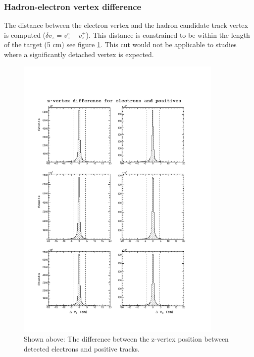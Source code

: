 \subsubsection*{Hadron-electron vertex difference}
The distance between the electron vertex and the hadron candidate track vertex is computed ($\delta v_{z} = v_{z}^{e} - v_{z}^{+}$).  This distance is constrained to be within the length of the target (5 cm) see figure \ref{fig:dvz}.  This cut would not be applicable to studies where a significantly detached vertex is expected.  

\begin{figure}
  \label{fig:dvz}
  \begin{center}
    \includegraphics[width=10cm]{image/plots/hadron-id/dvz.pdf}
    \caption{Shown above: The difference between the z-vertex position between detected electrons and positive tracks.}
  \end{center}
\end{figure}


%
%

